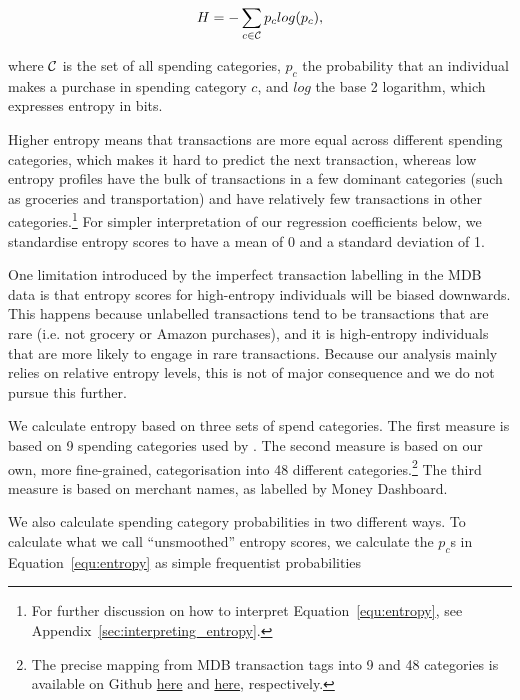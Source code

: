 \begin{equation}
\label{equ:entropy}
H = -\sum_{c \in \mathcal{C}}{p_c}log(p_c),
\end{equation}

\noindent where $\mathcal{C}$ is the set of all spending categories, $p_c$ the
probability that an individual makes a purchase in spending category $c$, and
$log$ the base 2 logarithm, which expresses entropy in bits.

Higher entropy means that transactions are more equal across different spending
categories, which makes it hard to predict the next transaction, whereas low
entropy profiles have the bulk of transactions in a few dominant categories
(such as groceries and transportation) and have relatively few transactions in
other categories.\footnote{For further discussion on how to interpret
Equation~\ref{equ:entropy}, see Appendix~\ref{sec:interpreting_entropy}.} For
simpler interpretation of our regression coefficients below, we standardise
entropy scores to have a mean of 0 and a standard deviation of 1.

One limitation introduced by the imperfect transaction labelling in the
MDB data is that entropy scores for high-entropy individuals will be biased
downwards. This happens because unlabelled transactions tend to be transactions
that are rare (i.e. not grocery or Amazon purchases), and it is high-entropy
individuals that are more likely to engage in rare transactions. Because our
analysis mainly relies on relative entropy levels, this is not of major
consequence and we do not pursue this further.

We calculate entropy based on three sets of spend categories. The first measure
is based on 9 spending categories used by \citet{muggleton2020evidence}. The
second measure is based on our own, more fine-grained, categorisation into 48
different categories.\footnote{The precise mapping from MDB transaction tags
    into 9 and 48 categories is available on Github
    \href{https://github.com/fabiangunzinger/entropy/blob/7fa9c565bf8959ea92a9d4fe2245da0864e19c27/src/data/txn_classifications.py\#L249}{here}
    and
    \href{https://github.com/fabiangunzinger/entropy/blob/7fa9c565bf8959ea92a9d4fe2245da0864e19c27/src/data/txn_classifications.py\#L503}{here},
respectively.} The third measure is based on merchant names, as labelled by
Money Dashboard.

We also calculate spending category probabilities in two different ways. To
calculate what we call ``unsmoothed'' entropy scores, we calculate the $p_c$s
in Equation~\ref{equ:entropy} as simple frequentist probabilities

